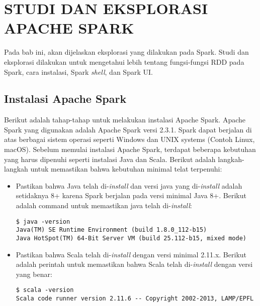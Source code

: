 \chapter{STUDI DAN EKSPLORASI APACHE SPARK}
\label{chap:studi dan eksplorasi}

Pada bab ini, akan dijelaskan eksplorasi yang dilakukan pada Spark. Studi dan eksplorasi dilakukan untuk mengetahui lebih tentang fungsi-fungsi RDD pada Spark, cara instalasi, Spark \textit{shell}, dan Spark UI.

\section{Instalasi Apache Spark}

Berikut adalah tahap-tahap untuk melakukan instalasi Apache Spark. Apache Spark yang  digunakan adalah Apache Spark versi 2.3.1. Spark dapat berjalan di atas berbagai sistem operasi seperti Windows dan UNIX systems (Contoh Linux, macOS). Sebelum memulai instalasi Apache Spark, terdapat beberapa kebutuhan yang harus dipenuhi seperti instalasi Java dan Scala. Berikut adalah langkah-langkah untuk memastikan bahwa kebutuhan minimal telat terpenuhi:

\begin{itemize}

\item Pastikan bahwa Java telah di-\textit{install} dan versi java yang di-\textit{install} adalah setidaknya 8+ karena Spark berjalan pada versi minimal Java 8+. Berikut adalah command untuk memastikan java telah di-\textit{install}:

\begin{verbatim}
$ java -version
Java(TM) SE Runtime Environment (build 1.8.0_112-b15)                                                                   Java HotSpot(TM) 64-Bit Server VM (build 25.112-b15, mixed mode) 
\end{verbatim}


\item Pastikan bahwa Scala telah di-\textit{install} dengan versi minimal 2.11.x. Berikut adalah perintah untuk memastikan bahwa Scala telah di-\textit{install} dengan versi yang benar:

\begin{verbatim}
$ scala -version
Scala code runner version 2.11.6 -- Copyright 2002-2013, LAMP/EPFL
\end{verbatim}

\end{itemize} 

